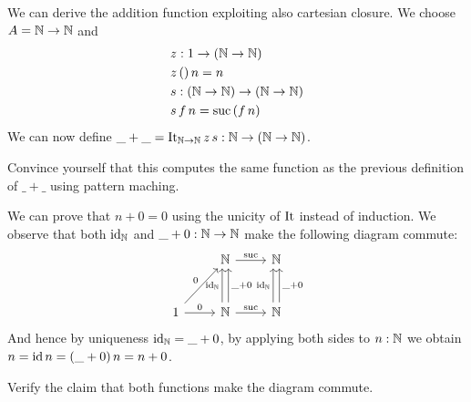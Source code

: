 We can derive the addition function exploiting also cartesian closure. We choose $A = \mathbb{N} \to \mathbb{N}$ and
\begin{align*}
& z : 1 \to (\mathbb{N} \to \mathbb{N}) \\
& z\,()\,n = n \\
& s : (\mathbb{N} \to \mathbb{N}) \to (\mathbb{N} \to \mathbb{N}) \\
& s\,f\,n = \mathrm{suc}\,(f\,n)
\end{align*}
We can now define $\_+\_ = \mathrm{It}_{\mathbb{N}\to\mathbb{N}}\,z\,s : \mathbb{N} \to (\mathbb{N} \to \mathbb{N})$.
\begin{exercise}
  Convince yourself that this computes the same function as the previous definition of $\_+\_$ using pattern maching.
\end{exercise}

We can prove that $n + 0 = 0$ using the unicity of $\mathrm{It}$ instead of induction. We observe that both $\mathrm{id}_{\mathbb{N}}$ and $\_+0 : \mathbb{N} \to \mathbb{N}$ make the following diagram commute:
\[\begin{tikzcd}[row sep = large]
& \Nat \arrow[r,"\suc"] & \Nat \\
1 \arrow[ur,"0"] \arrow[r,"0"] & \Nat \arrow[r,"\suc"] \arrow[u, shift left,"\id_\Nat" left] 
\arrow[u,shift right, "\_+0" right]
& \Nat  \arrow[u,shift left,"\id_\Nat" left]\arrow[u,shift right,"\_+0" right]
\end{tikzcd}\]  
And hence by uniqueness $\mathrm{id}_{\mathbb{N}} = \_+0$, by applying both sides to $n:\mathbb{N}$ we obtain 
$n = \mathrm{id}\,n = (\_ + 0)\,n = n + 0$. 
\begin{exercise}
  Verify the claim that both functions make the diagram commute.
\end{exercise}

